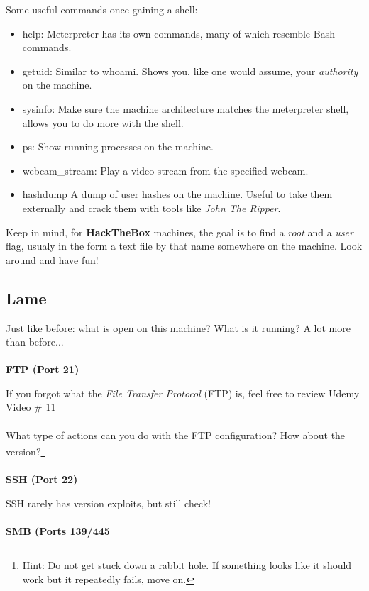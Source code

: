 \documentclass[a4paper,11pt]{article}
\renewcommand{\tt}[2][tt]{\textcolor{#1}{\ttfamily #2}}%
\begin{document}
Some useful commands once gaining a shell:
\begin{itemize}
    \item \tt{help}: Meterpreter has its own commands, many of which resemble Bash commands.
    \item \tt{getuid}: Similar to \tt{whoami}. Shows you, like one would assume, your \textit{authority} on the machine.
    \item \tt{sysinfo}: Make sure the machine architecture matches the meterpreter shell, allows you to do more with the shell.
    \item \tt{ps}: Show running processes on the machine.
    \item \tt{webcam\_stream}: Play a video stream from the specified webcam.
    \item \tt{hashdump} A dump of user hashes on the machine. Useful to take them externally and crack them with tools like \textit{John The Ripper}.
\end{itemize}
Keep in mind, for {\bfseries HackTheBox} machines, the goal is to find a \textit{root} and a \textit{user} flag, usualy in the form a text file by that name somewhere on the machine. Look around and have fun!
\pagebreak

\begin{center}
\subsection{Lame}
\end{center}

Just like before: what is open on this machine? What is it running? A lot more than before...
\\
\\
{\bfseries FTP (Port 21)}

If you forgot what the \textit{File Transfer Protocol} (FTP) is, feel free to review Udemy \href{https://www.udemy.com/course/practical-ethical-hacking/learn/lecture/16907282#overview}{Video \# 11}
\\
\\
What type of actions can you do with the FTP configuration? How about the version?\footnote[1]{Hint: Do not get stuck down a rabbit hole. If something looks like it should work but it repeatedly fails, move on.}
\\
\\
{\bfseries SSH (Port 22)}

SSH rarely has version exploits, but still check! 
\\
\\
{\bfseries SMB (Ports 139/445}
\end{document}
